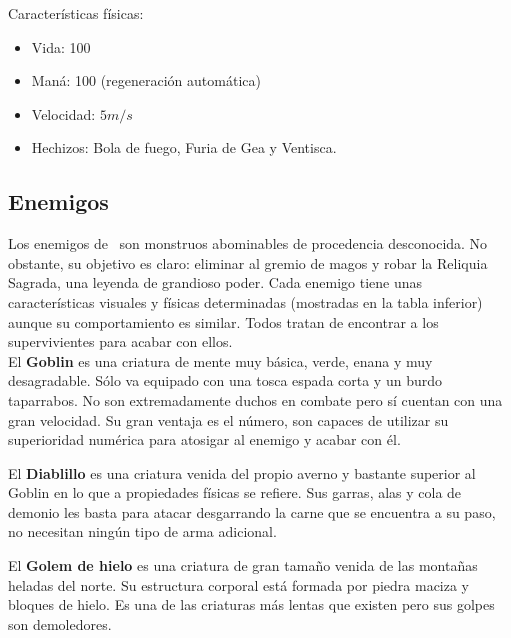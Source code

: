 
Características físicas:

\begin{itemize}
    \itemsep0em
    \item Vida: 100
    \item Maná: 100 (regeneración automática)
    \item Velocidad: $5 m/s$
    \item Hechizos: Bola de fuego, Furia de Gea y Ventisca.
\end{itemize}

\subsection*{Enemigos}

Los enemigos de \juego\ son monstruos abominables de procedencia desconocida.
No obstante, su objetivo es claro: eliminar al gremio de magos y robar la
Reliquia Sagrada, una leyenda de grandioso poder. Cada enemigo tiene unas
características visuales y físicas determinadas (mostradas en la tabla inferior)
aunque su comportamiento es similar. Todos tratan de encontrar a los supervivientes
para acabar con ellos.\\

El \textbf{Goblin} es una criatura de mente muy básica, verde, enana y 
muy desagradable. Sólo va equipado con una tosca espada corta y un burdo
taparrabos. No son extremadamente duchos en combate pero sí cuentan con una
gran velocidad. Su gran ventaja es el número, son capaces de utilizar su
superioridad numérica para atosigar al enemigo y acabar con él. 


El \textbf{Diablillo} es una criatura venida del propio averno y bastante
superior al Goblin en lo que a propiedades físicas se refiere. Sus garras, alas
y cola de demonio les basta para atacar desgarrando la carne que se encuentra
a su paso, no necesitan ningún tipo de arma adicional.


El \textbf{Golem de hielo} es una criatura de gran tamaño venida de las
montañas heladas del norte. Su estructura corporal está formada por piedra
maciza y bloques de hielo. Es una de las criaturas más lentas que existen
pero sus golpes son demoledores.

